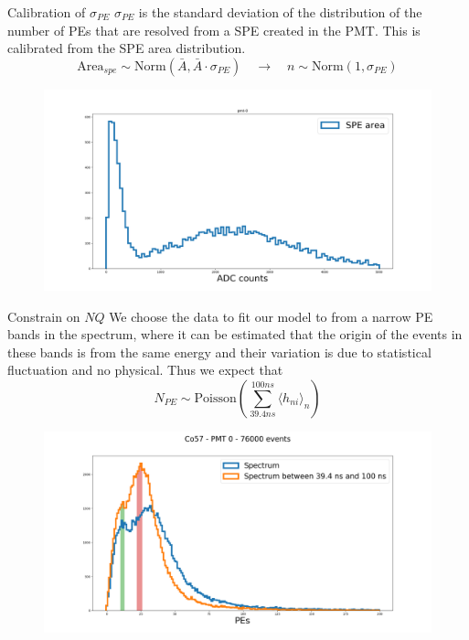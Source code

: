 \documentclass{beamer}
\begin{document}
\begin{frame}{Calibration of $\sigma_{PE}$}
$\sigma_{PE}$ is the standard deviation of the distribution of the number of PEs that are resolved from a SPE created in the PMT. This is calibrated from the SPE area distribution.
\begin{equation}
\text{Area}_{spe}\sim\text{Norm}(\bar{A}, \bar{A}\cdot\sigma_{PE})\quad \rightarrow \quad n\sim\text{Norm}(1,\sigma_{PE})
\end{equation}
\begin{figure}[h]
\includegraphics[width=1\linewidth]{area.png}
\end{figure}
\end{frame}

\begin{frame}{Constrain on $NQ$}
We choose the data to fit our model to from a narrow PE bands in the spectrum, where it can be estimated that the origin of the events in these bands is from the same energy and their variation is due to statistical fluctuation and no physical. Thus we expect that
\begin{equation}
N_{PE}\sim\text{Poisson}(\sum_{39.4 ns}^{100 ns}\langle h_{ni}\rangle_n)
\end{equation}  
\begin{figure}[h]
\includegraphics[width=0.75\linewidth]{spec_peak.png}
\end{figure}
\end{frame}
\end{document}
